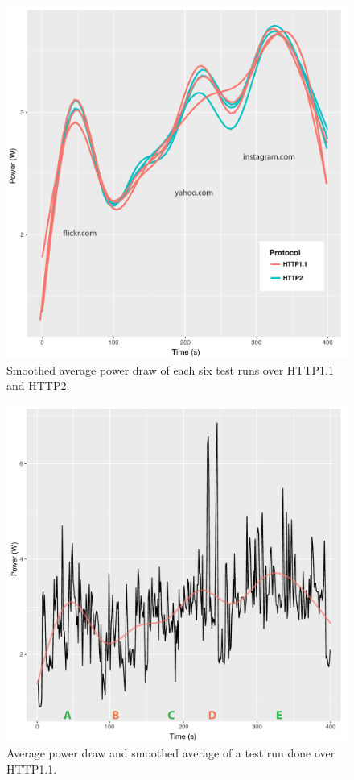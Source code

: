 \documentclass{article}
\begin{document}
\begin{figure}[h!]
\centering
\includegraphics[width=\linewidth]{images/smoothed_power}
\caption{Smoothed average power draw of each six test runs over HTTP1.1 and HTTP2.}
\label{fig:smoothed_power}
\end{figure}

\begin{figure}[t]
\centering
\includegraphics[width=\linewidth]{images/average_power}
\caption{Average power draw and smoothed average of a test run done over HTTP1.1.}
\label{fig:average_power}
\end{figure}
\end{document}
